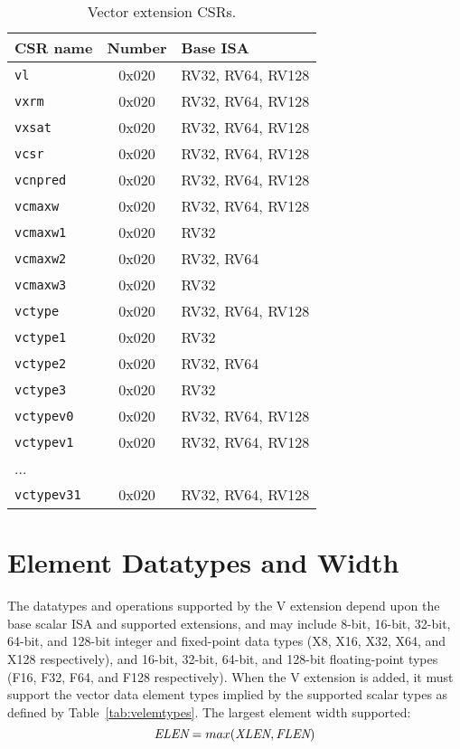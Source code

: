 \begin{table}
  \centering
  \begin{tabular}{|l|c|l|}
    \hline
    CSR name & Number & Base ISA \\
    \hline
    {\tt vl}    & 0x020 & RV32, RV64, RV128 \\
    {\tt vxrm}  & 0x020 & RV32, RV64, RV128 \\
    {\tt vxsat} & 0x020 & RV32, RV64, RV128 \\
    {\tt vcsr}  & 0x020 & RV32, RV64, RV128 \\
    \hline
    {\tt vcnpred} & 0x020 & RV32, RV64, RV128 \\
    \hline
    {\tt vcmaxw}  & 0x020 & RV32, RV64, RV128 \\
    {\tt vcmaxw1} & 0x020 & RV32 \\
    {\tt vcmaxw2} & 0x020 & RV32, RV64 \\
    {\tt vcmaxw3} & 0x020 & RV32 \\
    \hline
    {\tt vctype}  & 0x020 & RV32, RV64, RV128 \\
    {\tt vctype1} & 0x020 & RV32 \\
    {\tt vctype2} & 0x020 & RV32, RV64 \\
    {\tt vctype3} & 0x020 & RV32 \\
    \hline
    {\tt vctypev0}  & 0x020 & RV32, RV64, RV128 \\
      {\tt vctypev1}  & 0x020 & RV32, RV64, RV128 \\
        ... \\
      {\tt vctypev31}  & 0x020 & RV32, RV64, RV128 \\
   \hline
  \end{tabular}
  \caption{Vector extension CSRs.}
  \label{tab:vcsrs}
\end{table}

\section{Element Datatypes and Width}

The datatypes and operations supported by the V extension depend upon
the base scalar ISA and supported extensions, and may include 8-bit,
16-bit, 32-bit, 64-bit, and 128-bit integer and fixed-point data types
(X8, X16, X32, X64, and X128 respectively), and 16-bit, 32-bit,
64-bit, and 128-bit floating-point types (F16, F32, F64, and F128
respectively).  When the V extension is added, it must support the
vector data element types implied by the supported scalar types as
defined by Table~\ref{tab:velemtypes}.  The largest element width
supported:
\[ \mbox{\em ELEN} = max(\mbox{\em XLEN}, \mbox{\em FLEN}) \]


